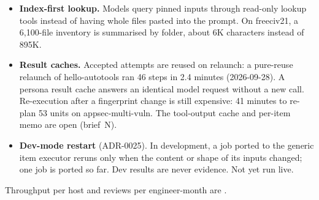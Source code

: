 \documentclass[10pt,a4paper]{article}
\begin{document}
\begin{itemize}
OSV index measured on 2026-09-29 (seven package ecosystems; Debian and Alpine were added on
2026-10-03 for base-image packages and are not yet measured) holds 283,781 advisory records, builds in about 12~s at 195~MB,
and answers lookups in under 1~ms against about 6~s from the raw archives. MITRE ATT\&CK, CAPEC
and the full CWE catalog will use the same feed rules when brief~O merges (decision log D-05, D-11).
\item \textbf{Index-first lookup.} Models query pinned inputs through read-only lookup tools instead
of having whole files pasted into the prompt. On freeciv21, a 6,100-file inventory is summarised by
folder, about 6K characters instead of 895K.
\item \textbf{Result caches.} Accepted attempts are reused on relaunch: a pure-reuse relaunch of
hello-autotools ran 46 steps in 2.4 minutes (2026-09-28). A persona result cache answers an
identical model request without a new call. Re-execution after a fingerprint change is still
expensive: 41 minutes to re-plan 53 units on appsec-multi-vuln. The tool-output cache and per-item
memo are open (brief~N).
\item \textbf{Dev-mode restart} (ADR-0025). In development, a job ported to the generic item
executor reruns only when the content or shape of its inputs changed; one job is ported so far. Dev
results are never evidence. Not yet run live.
\end{itemize}
Throughput per host and reviews per engineer-month are .
\end{document}
